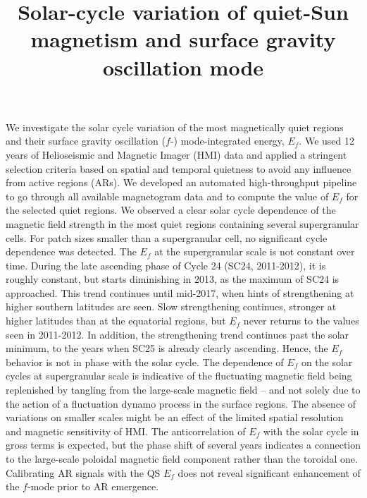 \documentclass{aa}
\begin{document}
\title{Solar-cycle variation of quiet-Sun magnetism and surface gravity oscillation mode}

%

{We investigate the solar cycle variation of the most magnetically quiet regions and
their surface gravity oscillation ($f$-) mode-integrated 
energy, $E_f$.
}
{We used 12 years of Helioseismic and Magnetic Imager (HMI) data and applied a stringent selection criteria based on
spatial and temporal quietness to avoid any influence from active regions (ARs).
We developed an automated high-throughput pipeline to go through all available magnetogram data
and to compute the value of 
$E_f$
for the selected quiet regions.}
{We observed a clear solar cycle dependence of the magnetic field strength in the most
quiet regions containing several supergranular cells. For patch sizes smaller than a supergranular
cell, no significant cycle dependence was detected. The $E_f$ at the supergranular scale 
is not constant over time.
During the late ascending phase of Cycle 24 (SC24, 2011-2012), it is roughly constant, but starts diminishing in 2013, as the maximum of SC24 is approached. This trend continues
until 
mid-2017,
when
hints of strengthening at higher southern latitudes
are seen.
Slow strengthening continues, stronger at higher latitudes than at the equatorial regions, but $E_f$ never returns to the values seen in 2011-2012. In addition, the strengthening trend continues past the solar minimum, to the years when SC25 is already clearly ascending. Hence, the $E_f$ behavior is not in phase with the solar cycle.
}
{
The dependence of $E_f$ on the solar cycles at supergranular scale
is indicative of the fluctuating magnetic
field being replenished by tangling from the large-scale magnetic field -- and not solely due to
the action of a fluctuation dynamo process in the surface regions. 
The absence of variations on smaller scales might be an effect of the
limited spatial resolution and magnetic sensitivity of HMI.
The 
anticorrelation of $E_f$ with the solar cycle in gross terms is expected, but the phase shift of several years indicates a connection to the large-scale poloidal magnetic field component rather than the toroidal one. Calibrating AR signals with the QS $E_f$ does not reveal significant enhancement of the $f$-mode prior to AR emergence.
}
\end{document}

